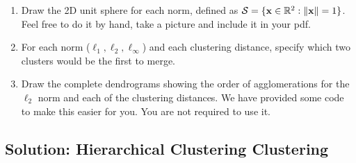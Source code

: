 \documentclass[submit]{harvardml}
\begin{document}
\begin{problem}
  \begin{enumerate}
  \item Draw the 2D unit sphere for each norm,
  defined as $\mathcal{S} = \{\mathbf{x} \in \mathbb{R}^2: \|\mathbf{x}\| = 1 \}$. Feel free to do
  it by hand, take a picture and include it in your pdf.
\item  For each norm ($\ell_1, \ell_2, \ell_\infty$) and each clustering distance, specify which two clusters would
  be the first to merge.
\item Draw the complete dendrograms showing the order of agglomerations for the $\ell_2$ norm and each of the clustering distances. We have provided some code to make this easier for you. You are not required to use it.
  \end{enumerate}


\end{problem}

\subsection*{Solution: Hierarchical Clustering Clustering}
\newpage 
\end{document}
